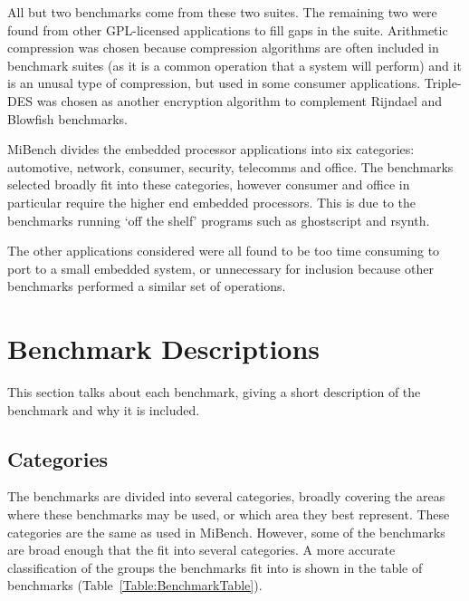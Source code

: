\documentclass[twocolumn]{article}
\begin{document}
All but two benchmarks come from these two suites. The remaining two were found from other GPL-licensed applications to fill gaps in the suite. Arithmetic compression\cite{Howard1992} was chosen because compression algorithms are often included in benchmark suites (as it is a common operation that a system will perform) and it is an unusal type of compression, but used in some consumer applications. Triple-DES was chosen as another encryption algorithm to complement Rijndael and Blowfish benchmarks.

MiBench divides the embedded processor applications into six categories: automotive, network, consumer, security, telecomms and office. The benchmarks selected broadly fit into these categories, however consumer and office in particular require the higher end embedded processors. This is due to the benchmarks running `off the shelf' programs such as ghostscript and rsynth.

The other applications considered were all found to be too time consuming to port to a small embedded system, or unnecessary for inclusion because other benchmarks performed a similar set of operations.


\section{Benchmark Descriptions}

This section talks about each benchmark, giving a short description of the benchmark and why it is included.

\subsection*{Categories}

The benchmarks are divided into several categories, broadly covering the areas where these benchmarks may be used, or which area they best represent. These categories are the same as used in MiBench. However, some of the benchmarks are broad enough that the fit into several categories. A more accurate classification of the groups the benchmarks fit into is shown in the table of benchmarks (Table~\ref{Table:BenchmarkTable}).
\end{document}
